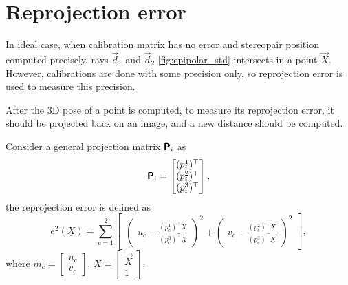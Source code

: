 

\section{Reprojection error}
\label{sec:error_reprojection}
In ideal case, when calibration matrix has no error and stereopair position computed precisely, rays $\vec{d}_1$ and $\vec{d}_2$ \autoref{fig:epipolar_std} intersects in a point $\vec{X}$. 
However, calibrations are done with some precision only, so reprojection error is used to measure this precision.

After the 3D pose of a point is computed, to measure its reprojection error, it should be projected back on an image, and a new distance should be computed.

Consider a general projection matrix $\pmb{\mathsf{P}}_i$ as
\begin{equation}
    \label{eq:p_general}
    \pmb{\mathsf{P}}_i = \begin{bmatrix} (p_i^1)^\top \\ (p_i^2)^\top \\ (p_i^3)^\top \end{bmatrix},
\end{equation}
the reprojection error is defined as 
\begin{equation}
    e^2(\underline{X}) = \sum_{c=1}^{2}{  
    \begin{bmatrix}
        \begin{pmatrix}
            u_c - \frac{(p_c^1)^\top \underline{X}}{(p_c^3)^\top \underline{X}}
        \end{pmatrix}^2 + 
        \begin{pmatrix}
            v_c - \frac{(p_c^2)^\top \underline{X}}{(p_c^3)^\top \underline{X}}
        \end{pmatrix}^2
    \end{bmatrix}
    },
\end{equation}
where $m_c = \begin{bmatrix} u_c \\ v_c \end{bmatrix}$, $\underline{X} = \begin{bmatrix} \vec{X} \\ 1 \end{bmatrix}$.
